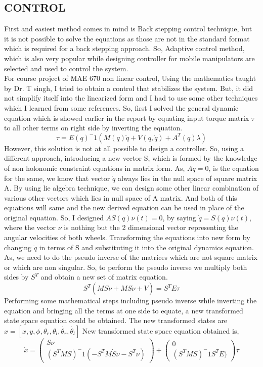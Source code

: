 \documentclass[12pt]{article}
\begin{document}
\subsection{CONTROL}
First and easiest method comes in mind is Back stepping control technique, but it is not possible to solve the equations as those are not in the standard format which is required for a back stepping approach. So, Adaptive control method, which is also very popular while designing controller for mobile manipulators are selected and used to control the system.
\\
For course project of MAE 670 non linear control, Using the mathematics taught by Dr. T singh, I tried to obtain a control that stabilizes the system. But, it did not simplify itself into the linearized form and I had to use some other techniques which I learned from some references. So, first I solved the general dynamic equation which is showed earlier in the report by equating input torque matrix $\tau$ to all other terms on right side by inverting the equation. 
\[\tau=E(q)^-1(M(q)\ddot{q}+V(q,\dot{q})+A^T(q)\lambda)\]
However, this solution is not at all possible to design a controller. So, using a different approach, introducing a new vector S, which is formed by the knowledge of non holonomic constraint equations in matrix form. As, $A\dot{q}=0$, is the equation for the same, we know that vector $\dot{q}$ always lies in the null space of square matrix A. By using lie algebra technique, we can design some other linear combination of various other vectors which lies in null space of A matrix. And both of this equations will same and the new derived equation can be used in place of the original equation. So, I designed $AS(q)\nu(t)=0$, by saying $\dot{q}=S(q)\nu(t)$, where the vector $\nu$ is nothing but the 2 dimensional vector representing the angular velocities of both wheels.
Transforming the equations into new form by changing $\ddot{q}$ in terms of S and substituting it into the original dynamics equation. 
As, we need to do the pseudo inverse of the matrices which are not square matrix or which are non singular. So, to perform the pseudo inverse we multiply both sides by $S^T$ and obtain a new set of matrix equation.
\[S^T(M\dot{S}\nu+MS\dot{\nu}+V)=S^TE\tau\]
Performing some mathematical steps including pseudo inverse while inverting the equation and bringing all the terms at one side to equate, a new transformed state space equation could be obtained. The new transformed states are $x=[x, y, \phi, \theta_r, \theta_l, \dot{\theta_r}, \dot{\theta_l}]$
New transformed state space equation obtained is,
\begin{equation*}
\dot{x}=
(\begin{matrix}
S\nu\\(S^TMS)^-1(-S^TM\dot{S}\nu-S^T\nu)
\end{matrix})
+
(\begin{matrix}
0\\(S^TMS)^-1S^TE)
\end{matrix})\tau
\end{equation*}
\end{document}

